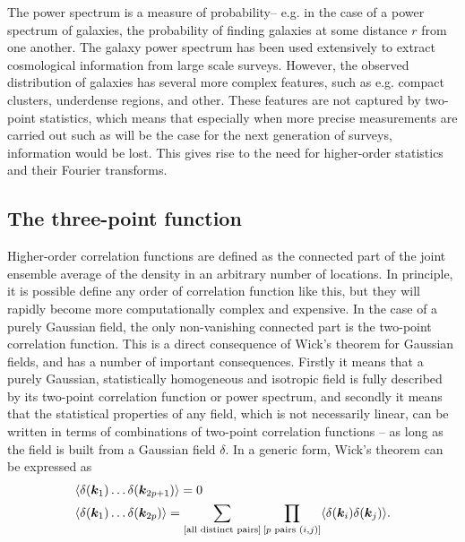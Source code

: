 The power spectrum is a measure of probability-- e.g. in the case of a power spectrum of galaxies, the probability of finding galaxies at some distance $r$ from one another. The galaxy power spectrum has been used extensively to extract cosmological information from large scale surveys. However, the observed distribution of galaxies has several more complex features, such as e.g. compact clusters, underdense regions, and other. These features are not captured by two-point statistics, which means that especially when more precise measurements are carried out such as will be the case for the next generation of surveys, information would be lost. This gives rise to the need for higher-order statistics and their Fourier transforms. 

\subsection{The three-point function}

Higher-order correlation functions are defined as the connected part of the joint ensemble average of the density in an arbitrary number of locations. In principle, it is possible define any order of correlation function like this, but they will rapidly become more computationally complex and expensive. In the case of a purely Gaussian field, the only non-vanishing connected part is the two-point correlation function. This is a direct consequence of Wick's theorem for Gaussian fields, and has a number of important consequences. Firstly it means that a purely Gaussian, statistically homogeneous and isotropic field is fully described by its two-point correlation function or power spectrum, and secondly it means that the statistical properties of any field, which is not necessarily linear, can be written in terms of combinations of two-point correlation functions -- as long as the field is built from a Gaussian field $\delta$. In a generic form, Wick's theorem can be expressed as 
\begin{align}
	&\langle \delta(\bm {k}_1) \ldots \delta(\bm{k}_{2p + 1}) \rangle = 0 \nonumber \\
	&\langle \delta(\bm {k}_1) \ldots \delta(\bm{k}_{2p})\rangle = \sum_{[\text{all distinct pairs}]} \prod_{[p \text{ pairs } (i,j)]} \langle \delta(\bm{k}_i) \delta(\bm{k}_j) \rangle.  
\end{align}

